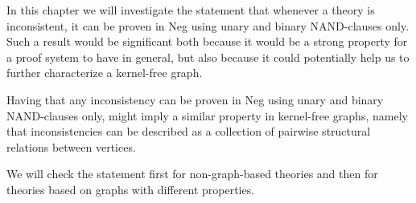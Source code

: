 In this chapter we will investigate the statement that whenever a theory is inconsistent, it can be proven in Neg using unary and binary NAND-clauses only.
Such a result would be significant both because it would be a strong property for a proof system to have in general, but also because it could potentially help us to further characterize a kernel-free graph.

Having that any inconsistency can be proven in Neg using unary and binary NAND-clauses only, might imply a similar property in kernel-free graphs, namely that inconsistencies can be described as a collection of pairwise structural relations between vertices.

We will check the statement first for non-graph-based theories and then for theories based on graphs with different properties.
